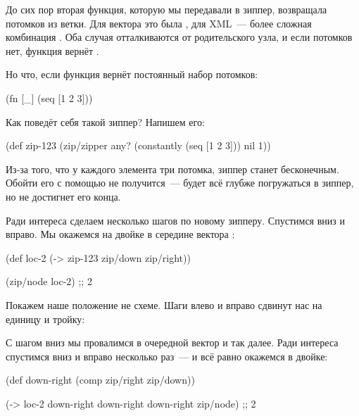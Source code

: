 До сих пор вторая функция, которую мы передавали в зиппер, возвращала потомков
из ветки. Для вектора это была , для XML~--- более сложная комбинация
. Оба случая отталкиваются от родительского узла, и
если потомков нет, функция вернёт .

Но что, если функция вернёт постоянный набор потомков:

\begin{english}
  \begin{clojure}
(fn [_]
  (seq [1 2 3]))
  \end{clojure}
\end{english}

Как поведёт себя такой зиппер? Напишем его:

\begin{english}
  \begin{clojure}
(def zip-123
  (zip/zipper any?
              (constantly (seq [1 2 3]))
              nil
              1))
  \end{clojure}
\end{english}


Из-за того, что у каждого элемента три потомка, зиппер станет бесконечным. Обойти
его с помощью  не получится~---  будет всё глубже погружаться
в зиппер, но не достигнет его конца.

Ради интереса сделаем несколько шагов по новому зипперу. Спустимся вниз и
вправо. Мы окажемся на двойке в середине вектора \code{[1 2 3]}:

\begin{english}
  \begin{clojure}
(def loc-2
  (-> zip-123
      zip/down
      zip/right))

(zip/node loc-2)
;; 2
  \end{clojure}
\end{english}

Покажем наше положение не схеме. Шаги влево и вправо сдвинут нас на единицу и
тройку:

\begin{figure}[H]
  \centering
  
\end{figure}

С шагом вниз мы провалимся в очередной вектор \code{[1 2 3]} и так далее. Ради
интереса спустимся вниз и вправо несколько раз~--- и всё равно окажемся в двойке:

\begin{english}
  \begin{clojure}
(def down-right
  (comp zip/right zip/down))

(-> loc-2
    down-right
    down-right
    down-right
    zip/node)
;; 2
  \end{clojure}
\end{english}

